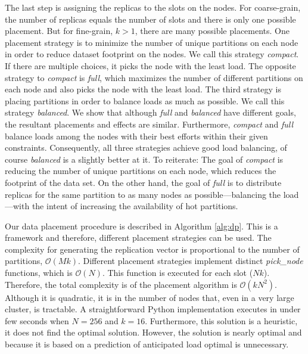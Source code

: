 The last step is assigning the replicas to the slots on the nodes.
For coarse-grain, the number of replicas equals the number of
slots and there is only one possible placement.
But for fine-grain, $k>1$, there are many possible placements.
One placement strategy is to minimize the number of unique
partitions on each node in order to reduce dataset footprint on the
nodes.
We call this strategy \emph{compact}.
If there are multiple choices,
it picks the node with the least load.
The opposite strategy to \emph{compact} is \emph{full},
which maximizes the number of different partitions on each node and
also picks the node with the least load.
The third strategy is placing partitions in order to balance loads as much as possible.
We call this strategy \emph{balanced}. 
We show that although \emph{full} and \emph{balanced} have
different goals, the resultant placements and effects are similar.
Furthermore, \emph{compact} and \emph{full}
balance loads among the
nodes with their best efforts within their given constraints.
Consequently, all three strategies achieve good load balancing, of
course \emph{balanced} is a slightly better at it.
To reiterate:
The goal of \emph{compact} is reducing the number of unique partitions
on each node, which reduces the 
footprint of the data set.
On the other hand, the goal of \emph{full} is to distribute
replicas for the same partition to as many nodes as possible---balancing
the load---with the intent of increasing the availability of hot partitions. 



Our data placement procedure is described in Algorithm \ref{alg:dp}.
This is a framework and therefore, different placement strategies can be used.
The complexity for generating the replication vector is proportional
to the number of partitions, $\mathcal{O}(Mk)$.
Different placement strategies implement distinct
\emph{pick\_node} functions,
which is $\mathcal{O}(N)$.
This function is executed for each slot ($Nk$).
Therefore, the total complexity is of the placement algorithm
is $\mathcal{O}(kN^2)$.
Although it is quadratic, it is in the number of nodes that, even in a
very large cluster, is tractable.
A straightforward Python implementation executes in under few seconds
when $N=256$ and $k=16$.
Furthermore, this solution is a heuristic, it does not find the
optimal solution.
However, the solution is nearly optimal and because it is based on a
prediction of anticipated load optimal is unnecessary.






